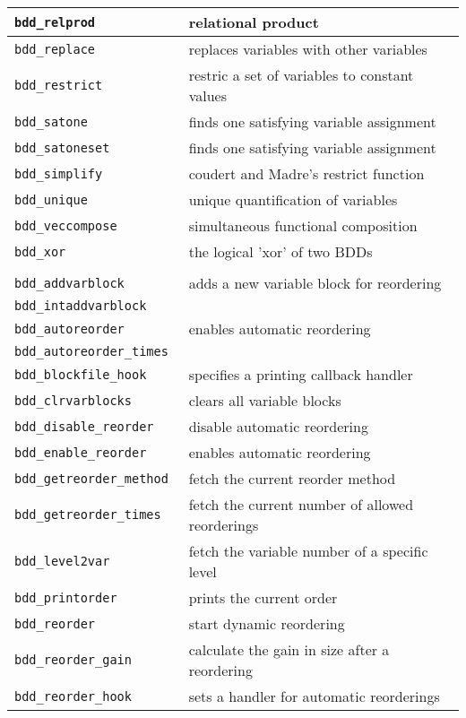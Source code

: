 \begin{supertabular}{|l|l|}
{\tt bdd\_relprod } & relational product  \\\hline
{\tt bdd\_replace } & replaces variables with other variables  \\\hline
{\tt bdd\_restrict } & restric a set of variables to constant values  \\\hline
{\tt bdd\_satone } & finds one satisfying variable assignment  \\\hline
{\tt bdd\_satoneset } & finds one satisfying variable assignment  \\\hline
{\tt bdd\_simplify } & coudert and Madre's restrict function  \\\hline
{\tt bdd\_unique } & unique quantification of variables  \\\hline
{\tt bdd\_veccompose } & simultaneous functional composition  \\\hline
{\tt bdd\_xor } & the logical 'xor' of two BDDs  \\\hline
{} \\ \hline
{\tt bdd\_addvarblock } & adds a new variable block for reordering  \\
{\tt bdd\_intaddvarblock } & \\\hline
{\tt bdd\_autoreorder } & enables automatic reordering  \\
{\tt bdd\_autoreorder\_times } & \\\hline
{\tt bdd\_blockfile\_hook } & specifies a printing callback handler  \\\hline
{\tt bdd\_clrvarblocks } & clears all variable blocks  \\\hline
{\tt bdd\_disable\_reorder } & disable automatic reordering  \\\hline
{\tt bdd\_enable\_reorder } & enables automatic reordering  \\\hline
{\tt bdd\_getreorder\_method } & fetch the current reorder method  \\\hline
{\tt bdd\_getreorder\_times } & fetch the current number of allowed reorderings  \\\hline
{\tt bdd\_level2var } & fetch the variable number of a specific level  \\\hline
{\tt bdd\_printorder } & prints the current order  \\\hline
{\tt bdd\_reorder } & start dynamic reordering  \\\hline
{\tt bdd\_reorder\_gain } & calculate the gain in size after a reordering  \\\hline
{\tt bdd\_reorder\_hook } & sets a handler for automatic reorderings  \\\hline

\end{supertabular}
